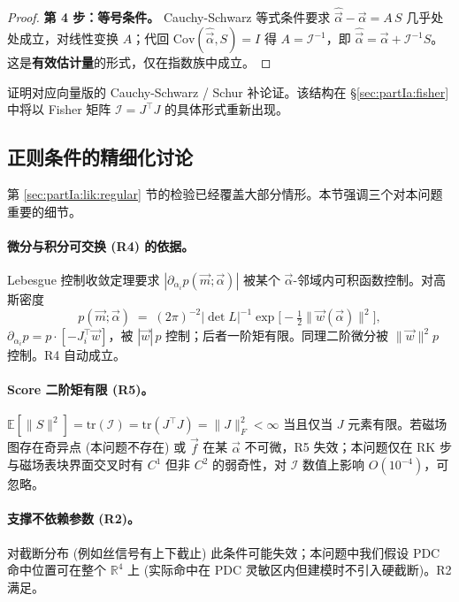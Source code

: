 \begin{proof}
  \textbf{第 4 步：等号条件。}
  Cauchy-Schwarz 等式条件要求 $\hat{\vec\alpha}-\vec\alpha=A\,S$ 几乎处处成立，对线性变换 $A$；代回 $\mathrm{Cov}(\hat{\vec\alpha},S)=I$ 得 $A=\mathcal I^{-1}$，即 $\hat{\vec\alpha}=\vec\alpha+\mathcal I^{-1}S$。这是\textbf{有效估计量}的形式，仅在指数族中成立。
\end{proof}

证明对应向量版的 Cauchy-Schwarz / Schur 补论证。该结构在 §\ref{sec:partIa:fisher} 中将以 Fisher 矩阵 $\mathcal I=J^\top J$ 的具体形式重新出现。

\subsection{正则条件的精细化讨论}
\label{sec:partIa:crb:reg}

第 \ref{sec:partIa:lik:regular} 节的检验已经覆盖大部分情形。本节强调三个对本问题重要的细节。

\paragraph{微分与积分可交换 (R4) 的依据。} Lebesgue 控制收敛定理要求 $|\partial_{\alpha_i}p(\vec m;\vec\alpha)|$ 被某个 $\vec\alpha$-邻域内可积函数控制。对高斯密度
\begin{equation}
  p(\vec m;\vec\alpha) \;=\;(2\pi)^{-2}|\det L|^{-1}\exp\!\bigl[-\tfrac12\|\vec w(\vec\alpha)\|^2\bigr],
\end{equation}
$\partial_{\alpha_i}p=p\cdot[-J_i^\top\vec w]$，被 $|\vec w|\,p$ 控制；后者一阶矩有限。同理二阶微分被 $\|\vec w\|^2 p$ 控制。R4 自动成立。

\paragraph{Score 二阶矩有限 (R5)。} $\mathbb E[\|S\|^2]=\mathrm{tr}(\mathcal I)=\mathrm{tr}(J^\top J)=\|J\|_F^2<\infty$ 当且仅当 $J$ 元素有限。若磁场图存在奇异点 (本问题不存在) 或 $\vec f$ 在某 $\vec\alpha$ 不可微，R5 失效；本问题仅在 RK 步与磁场表块界面交叉时有 $C^1$ 但非 $C^2$ 的弱奇性，对 $\mathcal I$ 数值上影响 $O(10^{-4})$，可忽略。

\paragraph{支撑不依赖参数 (R2)。} 对截断分布 (例如丝信号有上下截止) 此条件可能失效；本问题中我们假设 PDC 命中位置可在整个 $\mathbb R^4$ 上 (实际命中在 PDC 灵敏区内但建模时不引入硬截断)。R2 满足。

